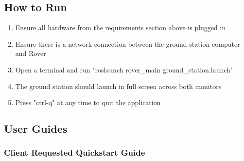 \subsection{How to Run}
\begin{enumerate}
\item Ensure all hardware from the requirements section above is plugged in
\item Ensure there is a network connection between the ground station computer and Rover
\item Open a terminal and run "roslaunch rover\_main ground\_station.launch"
\item The ground station should launch in full screen across both monitors
\item Press "ctrl-q" at any time to quit the application
\end{enumerate}


\subsection{User Guides}
\subsubsection{Client Requested Quickstart Guide}
